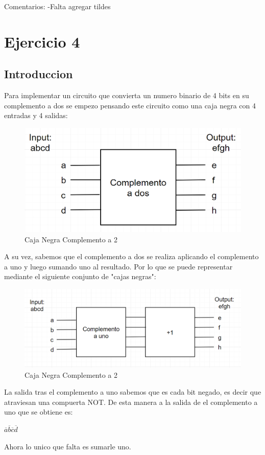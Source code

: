 \documentclass{article}
\begin{document}
	Comentarios:
	\newline -Falta agregar tildes
	\section{Ejercicio 4}
	\subsection{Introduccion}
		\hspace{10mm} Para implementar un circuito que convierta un numero binario de 4 bits en su complemento a dos se empezo pensando este circuito como una caja negra con 4 entradas y 4 salidas:
		\begin{figure}[h!]
			\includegraphics[width=\linewidth,scale=0.5]{comp2.png}
  			\caption{Caja Negra Complemento a 2}
		\end{figure}
		\newline \hspace{10mm} A su vez, sabemos que el complemento a dos se realiza aplicando el complemento a uno y luego sumando uno al resultado. Por lo que se puede representar mediante el siguiente conjunto de "cajas negras":
		\begin{figure}[h!]
			\includegraphics[width=\linewidth,scale=0.5]{comp1+1.png}
  			\caption{Caja Negra Complemento a 2}
		\end{figure}
		\newline \hspace{10mm} La salida tras el complemento a uno sabemos que es cada bit negado, es decir que atraviesan una compuerta NOT. De esta manera a la salida de el complemento a uno que se obtiene es: 
		\newline \centerline{$\overline{a} \overline{b} \overline{c} \overline{d}$} 
		\hspace{10mm} Ahora lo unico que falta es sumarle uno.
\end{document}
